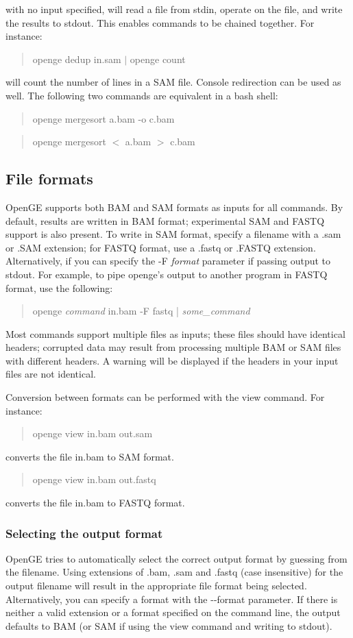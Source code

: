 \documentclass[11pt]{article}
\newcommand {\cmd}[1] {\begin{quote}#1\end{quote}}
\begin{document}
with no input specified, will read a file from stdin, operate on the file, and write the results to stdout. This enables commands to be chained together. For instance:

\cmd{openge dedup in.sam $|$ openge count}

will count the number of lines in a SAM file. Console redirection can be used as well. The following two commands are equivalent in a bash shell:

\cmd{openge mergesort a.bam -o c.bam}
\cmd{openge mergesort $<$ a.bam $>$ c.bam}

\subsection {File formats}

OpenGE supports both BAM and SAM formats as inputs for all commands. By default, results are written in BAM format; experimental SAM and FASTQ support is also present. To write in SAM format, specify a filename with a .sam or .SAM extension; for FASTQ format, use a .fastq or .FASTQ extension. Alternatively, if you can specify the -F \textit{format} parameter if passing output to stdout. For example, to pipe openge's output to another program in FASTQ format, use the following:

\cmd{openge \textit{command} in.bam -F fastq | \textit{some\_command}}

Most commands support multiple files as inputs; these files should have identical headers; corrupted data may result from processing multiple BAM or SAM files with different headers. A warning will be displayed if the headers in your input files are not identical.

Conversion between formats can be performed with the view command. For instance:
\cmd{openge view in.bam out.sam}
converts the file in.bam to SAM format.

\cmd{openge view in.bam out.fastq}
converts the file in.bam to FASTQ format.

\subsubsection {Selecting the output format}
OpenGE tries to automatically select the correct output format by guessing from the filename. Using extensions of .bam, .sam and .fastq (case insensitive) for the output filename will result in the appropriate file format being selected. Alternatively, you can specify a format with the {-}{-}format parameter. If there is neither a valid extension or a format specified on the command line, the output defaults to BAM (or SAM if using the view command and writing to stdout).
\end{document}
